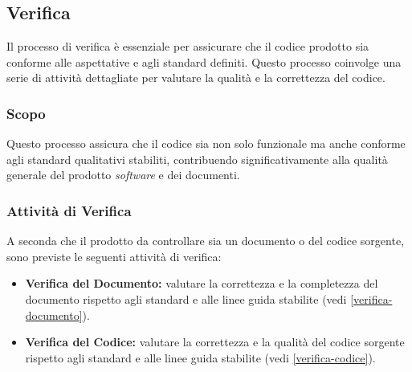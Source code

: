 \subsection{Verifica}

Il processo di verifica è essenziale per assicurare che il codice prodotto sia
conforme alle aspettative e agli standard definiti. Questo processo coinvolge
una serie di attività dettagliate per valutare la qualità e la correttezza del
codice.

\subsubsection{Scopo}
Questo processo assicura che il codice sia non solo funzionale ma anche
conforme agli standard qualitativi stabiliti, contribuendo significativamente
alla qualità generale del prodotto \textit{software} e dei documenti.

\subsubsection{Attività di Verifica}
A seconda che il prodotto da controllare sia un documento o del codice sorgente,
sono previste le seguenti attività di verifica:
\begin{itemize}
	\item \textbf{Verifica del Documento:} valutare la correttezza e la
	      completezza del documento rispetto agli standard e alle linee guida
	      stabilite (vedi \cref{verifica-documento}).

	\item \textbf{Verifica del Codice:} valutare la correttezza e la qualità del
	      codice sorgente rispetto agli standard e alle linee guida stabilite
	      (vedi \cref{verifica-codice}).
\end{itemize}
